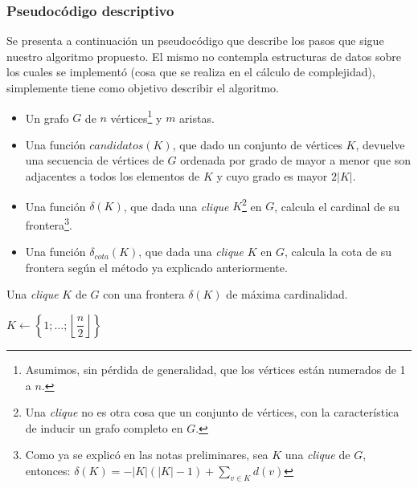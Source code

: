 \subsubsection{Pseudoc\'odigo descriptivo}
\par Se presenta a continuaci\'on un pseudoc\'odigo que describe los pasos que sigue
    nuestro algoritmo propuesto. El mismo no contempla estructuras de datos sobre
    los cuales se implement\'o (cosa que se realiza en el c\'alculo de complejidad),
    simplemente tiene como objetivo describir el algoritmo.

\begin{pseudocodigo}
    \Require\Statex
        \begin{itemize}
            \item Un grafo $G$ de $n$ v\'ertices\footnote{Asumimos, sin p\'erdida 
                de generalidad, que los v\'ertices est\'an numerados de 1 a $n$.}
                y $m$ aristas.

            \item Una funci\'on $candidatos(K)$, que dado un conjunto de v\'ertices
                $K$, devuelve una secuencia de v\'ertices de $G$ ordenada por grado
                de mayor a menor que son adjacentes a todos los elementos de $K$ y
                cuyo grado es mayor $2|K|$.

            \item Una funci\'on $\delta(K)$, que dada una \emph{clique} $K$\footnote{Una
                \emph{clique} no es otra cosa que un conjunto de v\'ertices, con la
                caracter\'istica de inducir un grafo completo en $G$.} en $G$, calcula
                el cardinal de su frontera\footnote{Como ya se explic\'o en las notas preliminares,
                sea $K$ una \emph{clique} de $G$, entonces: $\delta(K) = - |K|(|K|-1) +
                \displaystyle\sum_{v \in K} d(v)$}.

            \item Una funci\'on $\delta_{cota}(K)$, que dada una \emph{clique} $K$
                en $G$, calcula la cota de su frontera seg\'un el m\'etodo
                ya explicado anteriormente.

        \end{itemize}
    \Statex
    \Ensure Una \emph{clique} $K$ de $G$ con una frontera $\delta(K)$ de m\'axima
        cardinalidad.

    \Statex

     
        \State $K \gets \left\{1;\dots;\left\lfloor\dfrac{n}{2}\right\rfloor\right\}$


\end{pseudocodigo}
